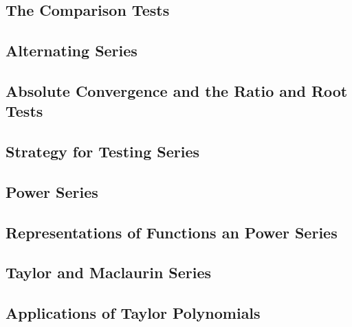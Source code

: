 \documentclass{article}
\begin{document}
    \subsection{The Comparison Tests}
    \begin{outline}
        
    \end{outline}
    \subsection{Alternating Series}
    \begin{outline}
        
    \end{outline}
    \subsection{Absolute Convergence and the Ratio and Root Tests}
    \begin{outline}
        
    \end{outline}
    \subsection{Strategy for Testing Series}
    \begin{outline}
        
    \end{outline}
    \subsection{Power Series}
    \begin{outline}
        
    \end{outline}
    \subsection{Representations of Functions an Power Series}
    \begin{outline}
        
    \end{outline}
    \subsection{Taylor and Maclaurin Series}
    \begin{outline}
        
    \end{outline}
    \subsection{Applications of Taylor Polynomials}
    \begin{outline}
        
    \end{outline}
\end{document}
